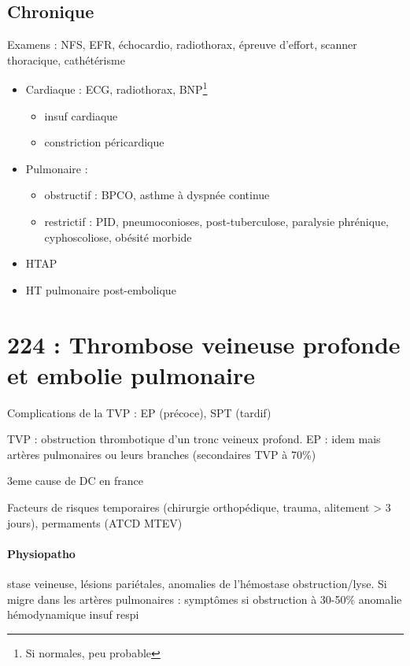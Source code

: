 \documentclass{article}
\begin{document}
\subsection{Chronique}
Examens : NFS, EFR, échocardio, radiothorax, épreuve d'effort, scanner thoracique,
cathétérisme

\begin{itemize}
\item Cardiaque : ECG, radiothorax, BNP\footnote{Si normales, peu probable}
    \begin{itemize}
      \item insuf cardiaque
      \item constriction péricardique
    \end{itemize}
  \item Pulmonaire :
    \begin{itemize}
      \item obstructif : BPCO, asthme à dyspnée continue
      \item restrictif : PID, pneumoconioses, post-tuberculose, paralysie phrénique,
        cyphoscoliose, obésité morbide
    \end{itemize}
  \item HTAP
  \item HT pulmonaire post-embolique
\end{itemize}

\section{224 : Thrombose veineuse profonde et embolie pulmonaire}%
\label{sec:224_thrombose_veineuse_profonde_et_embolie_pulmonaire}
Complications de la \gls{TVP} : \gls{EP} (précoce), \gls{SPT} (tardif)

TVP : obstruction thrombotique d'un tronc veineux profond. EP : idem mais
artères pulmonaires ou leurs branches (secondaires TVP à 70\%)

3eme cause de DC en france

Facteurs de risques temporaires (chirurgie orthopédique, trauma, alitement > 3
jours), permaments (ATCD \gls{MTEV})

\paragraph{Physiopatho} stase veineuse, lésions pariétales, anomalies de l'hémostase \thus
obstruction/lyse. Si migre dans les artères pulmonaires : symptômes si
obstruction à 30-50\% \thus anomalie hémodynamique \thus insuf respi
\end{document}
